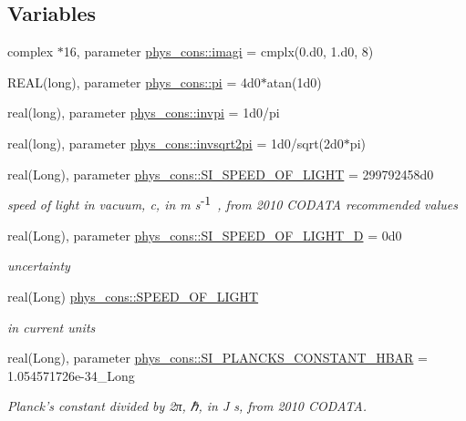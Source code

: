 \subsection*{Variables}
\begin{DoxyCompactItemize}
\item 
complex $\ast$16, parameter \hyperlink{namespacephys__cons_af15f96806bfb6b9c6b1a279971d5d34b}{phys\_\-cons::imagi} = cmplx(0.d0, 1.d0, 8)
\item 
REAL(long), parameter \hyperlink{namespacephys__cons_aae3c6cb8ae765b0262bb110ff739ba9d}{phys\_\-cons::pi} = 4d0$\ast$atan(1d0)
\item 
real(long), parameter \hyperlink{namespacephys__cons_aa8683f00f4216acc1822dfcb85b1ee00}{phys\_\-cons::invpi} = 1d0/pi
\item 
real(long), parameter \hyperlink{namespacephys__cons_a369d33713444a99a71f80a74c0652d4e}{phys\_\-cons::invsqrt2pi} = 1d0/sqrt(2d0$\ast$pi)
\item 
real(Long), parameter \hyperlink{namespacephys__cons_ae265fad966cfc841f9a073a52955d742}{phys\_\-cons::SI\_\-SPEED\_\-OF\_\-LIGHT} = 299792458d0
\begin{DoxyCompactList}\small\item\em speed of light in vacuum, c, in m s$^{\mbox{-\/1}}$ , from 2010 CODATA recommended values \item\end{DoxyCompactList}\item 
real(Long), parameter \hyperlink{namespacephys__cons_a5547546b06eb8853e52e304b25cc7596}{phys\_\-cons::SI\_\-SPEED\_\-OF\_\-LIGHT\_\-D} = 0d0
\begin{DoxyCompactList}\small\item\em uncertainty \item\end{DoxyCompactList}\item 
real(Long) \hyperlink{namespacephys__cons_ac31faa4bb5e82aecbdffa3b3d43a1736}{phys\_\-cons::SPEED\_\-OF\_\-LIGHT}
\begin{DoxyCompactList}\small\item\em in current units \item\end{DoxyCompactList}\item 
real(Long), parameter \hyperlink{namespacephys__cons_ab49e79c21c913c5857dedf2c555d2c21}{phys\_\-cons::SI\_\-PLANCKS\_\-CONSTANT\_\-HBAR} = 1.054571726e-\/34\_\-Long
\begin{DoxyCompactList}\small\item\em Planck's constant divided by 2π, ℏ, in J s, from 2010 CODATA. \item\end{DoxyCompactList}\item 

\end{DoxyCompactItemize}
